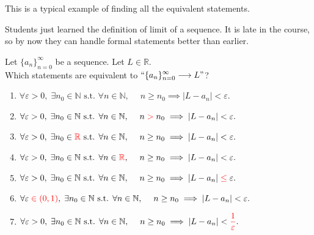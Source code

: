 \documentclass[11pt]{article}
\begin{document}
	\vspace{.5cm}
	\begin{example}
		This is a typical example of finding all the equivalent statements.
		\begin{background}
			Students just learned the definition of limit of a sequence. It is late in
			the course, so by now they can handle formal statements better than earlier.
		\end{background}

		\begin{question}
			Let ${\displaystyle \{a_n\}_{n=0}^{\infty}}$ be a sequence. Let
			${\displaystyle L \in \mathbb{R}}$. \\ Which statements are equivalent to ${\displaystyle ``\{a_n\}_{n=0}^{\infty} \longrightarrow L"}$?

			\begin{enumerate}
				\item ${\displaystyle \forall \varepsilon>0, \; \exists n_0 \in \mathbb{N} \text{ s.t. } \forall n \in \mathbb{N}, \; \quad n \geq n_0 \implies |L-a_n| < \varepsilon.}$

				\item ${\displaystyle \forall \varepsilon>0, \; \exists n_0 \in \mathbb{N} \text{ s.t. } \forall n \in \mathbb{N}, \; \quad n \; {\color{red}  > } \; n_0 \implies |L-a_n| < \varepsilon.}$

				\item ${\displaystyle \forall \varepsilon>0, \; \exists n_0 \in {\color{red} \mathbb{R}} \text{ s.t. } \forall n \in \mathbb{N}, \; \quad n \geq n_0 \implies |L-a_n| < \varepsilon.}$

				\item ${\displaystyle \forall \varepsilon>0, \; \exists n_0 \in \mathbb{N} \text{ s.t. } \forall n \in {\color{red}  \mathbb{R}}, \; \quad n \geq n_0 \implies |L-a_n| < \varepsilon.}$

				\item ${\displaystyle \forall \varepsilon>0, \; \exists n_0 \in \mathbb{N} \text{ s.t. } \forall n \in \mathbb{N}, \; \quad n \geq n_0 \implies |L-a_n| \; {\color{red} \leq} \; \varepsilon.}$

				\item ${\displaystyle \forall \varepsilon \; {\color{red} \in (0,1)}, \; \exists n_0 \in \mathbb{N} \text{ s.t. } \forall n \in \mathbb{N}, \; \quad n \geq n_0 \implies |L-a_n| < \varepsilon.}$

				\item ${\displaystyle \forall \varepsilon>0, \; \exists n_0 \in \mathbb{N} \text{ s.t. } \forall n \in \mathbb{N}, \; \quad n \geq n_0 \implies |L-a_n| < {\color{red} \frac{1}{\varepsilon}}.}$


\end{enumerate}
\end{question}
\end{example}
\end{document}

